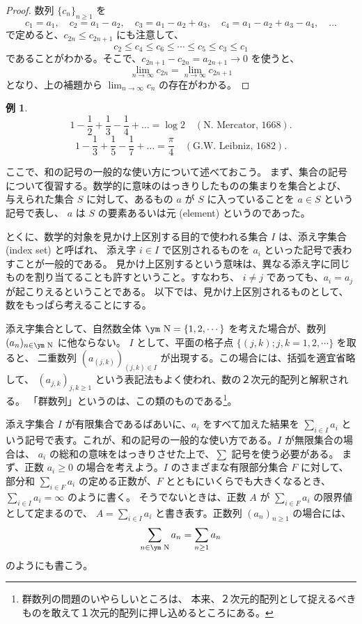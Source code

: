 \documentclass[a4paper]{jsarticle}
\theoremstyle{definition}
\newtheorem{Example}[Theorem]{例}
\theoremstyle{remark}
\newcommand{\N}{\text{\ym N}}
\begin{document}
\begin{proof}
数列 $\{ c_n\}_{n \geq 1}$ を
\[
c_1 = a_1,\quad c_2 = a_1 - a_2,\quad c_3 = a_1-a_2+a_3,\quad c_4 = a_1-a_2+a_3-a_4,\quad \dots 
\]
で定めると、$c_{2n} \leq c_{2n+1}$ にも注意して、
\[
c_2 \leq c_4 \leq c_6 \leq \cdots \leq c_5 \leq c_3 \leq c_1
\]
であることがわかる。そこで、$c_{2n+1} - c_{2n} = a_{2n+1} \to 0$ を使うと、
\[
\lim_{n \to \infty} c_{2n} = \lim_{n \to \infty} c_{2n+1} 
\]
となり、上の補題から $\displaystyle \lim_{n \to \infty} c_n$ の存在がわかる。
\end{proof} 

\begin{Example}
\[
1 - \frac{1}{2} + \frac{1}{3} - \frac{1}{4} + \dots = \log 2
\quad(\text{N.~Mercator, 1668}).
\]
\[
1 - \frac{1}{3} + \frac{1}{5} - \frac{1}{7} + \dots 
= \frac{\pi}{4} 
\quad(\text{G.W.~Leibniz, 1682}).
\]
\end{Example}

ここで、和の記号の一般的な使い方について述べておこう。
まず、集合の記号について復習する。数学的に意味のはっきりしたものの集まりを集合とよび、
与えられた集合 $S$ に対して、あるもの $a$ が $S$ に入っていることを $a \in S$ という記号で表し、
$a$ は $S$ の要素あるいは元 (element) というのであった。

とくに、数学的対象を見かけ上区別する目的で使われる集合 $I$ は、添え字集合 (index set) と呼ばれ、
添え字 $i \in I$ で区別されるものを $a_i$ といった記号で表わすことが一般的である。
見かけ上区別するという意味は、異なる添え字に同じものを割り当てることも許すということ。すなわち、
$i \not= j$ であっても、$a_i = a_j$ が起こりえるということである。
以下では、見かけ上区別されるものとして、数をもっぱら考えることにする。

添え字集合として、自然数全体 $\N = \{ 1,2,\cdots \}$ を考えた場合が、数列 $(a_n)_{n \in \N}$ に他ならない。
$I$ として、平面の格子点 $\{ (j,k); j, k  = 1, 2, \cdots\}$ を取ると、
二重数列 $(a_{(j,k)})_{(j,k) \in I}$ が出現する。この場合には、括弧を適宜省略して、
$(a_{j,k})_{j,k \geq 1}$ という表記法もよく使われ、数の２次元的配列と解釈される。
「群数列」というのは、この類のものである\footnote{群数列の問題のいやらしいところは、
本来、２次元的配列として捉えるべきものを敢えて１次元的配列に押し込めるところにある。}。

添え字集合 $I$ が有限集合であるばあいに、$a_i$ をすべて加えた結果を
$\sum_{i \in I} a_i$ という記号で表す。これが、和の記号の一般的な使い方である。$I$ が無限集合の場合は、
$a_i$ の総和の意味をはっきりさせた上で、$\sum$ 記号を使う必要がある。
まず、正数 $a_i \geq 0$ の場合を考えよう。$I$ のさまざまな有限部分集合 $F$ に対して、部分和
$\sum_{i \in F} a_i$ の定める正数が、$F$ とともにいくらでも大きくなるとき、
$\sum_{i \in I} a_i = \infty$ のように書く。
そうでないときは、正数 $A$ が $\sum_{i \in F} a_i$ の限界値として定まるので、
$A = \sum_{i \in I} a_i$ と書き表す。正数列 $(a_n)_{n \geq 1}$ の場合には、
\[ 
\sum_{n \in \N} a_n = \sum_{n \geq 1} a_n 
\]
のようにも書こう。
\end{document}
